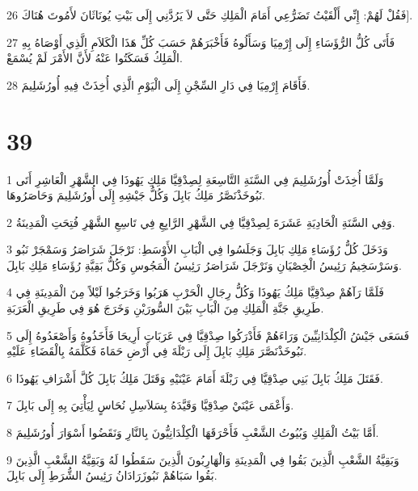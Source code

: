 \par 26 فَقُلْ لَهُمْ: إِنِّي أَلْقَيْتُ تَضَرُّعِي أَمَامَ الْمَلِكِ حَتَّى لاَ يَرُدَّنِي إِلَى بَيْتِ يُونَاثَانَ لأَمُوتَ هُنَاكَ].
\par 27 فَأَتَى كُلُّ الرُّؤَسَاءِ إِلَى إِرْمِيَا وَسَأَلُوهُ فَأَخْبَرَهُمْ حَسَبَ كُلِّ هَذَا الْكَلاَمِ الَّذِي أَوْصَاهُ بِهِ الْمَلِكُ فَسَكَتُوا عَنْهُ لأَنَّ الأَمْرَ لَمْ يُسْمَعْ.
\par 28 فَأَقَامَ إِرْمِيَا فِي دَارِ السِّجْنِ إِلَى الْيَوْمِ الَّذِي أُخِذَتْ فِيهِ أُورُشَلِيمَ.

\chapter{39}

\par 1 وَلَمَّا أُخِذَتْ أُورُشَلِيمَ فِي السَّنَةِ التَّاسِعَةِ لِصِدْقِيَّا مَلِكِ يَهُوذَا فِي الشَّهْرِ الْعَاشِرِ أَتَى نَبُوخَذْنَصَّرُ مَلِكُ بَابِلَ وَكُلُّ جَيْشِهِ إِلَى أُورُشَلِيمَ وَحَاصَرُوهَا.
\par 2 وَفِي السَّنَةِ الْحَادِيَةِ عَشَرَةَ لِصِدْقِيَّا فِي الشَّهْرِ الرَّابِعِ فِي تَاسِعِ الشَّهْرِ فُتِحَتِ الْمَدِينَةُ.
\par 3 وَدَخَلَ كُلُّ رُؤَسَاءِ مَلِكِ بَابِلَ وَجَلَسُوا فِي الْبَابِ الأَوْسَطِ: نَرْجَلَ شَرَاصَرُ وَسَمْجَرْ نَبُو وَسَرْسَخِيمُ رَئِيسُ الْخِصْيَانِ وَنَرْجَلَ شَرَاصَرُ رَئِيسُ الْمَجُوسِ وَكُلُّ بَقِيَّةِ رُؤَسَاءِ مَلِكِ بَابِلَ.
\par 4 فَلَمَّا رَآهُمْ صِدْقِيَّا مَلِكُ يَهُوذَا وَكُلُّ رِجَالِ الْحَرْبِ هَرَبُوا وَخَرَجُوا لَيْلاً مِنَ الْمَدِينَةِ فِي طَرِيقِ جَنَّةِ الْمَلِكِ مِنَ الْبَابِ بَيْنَ السُّورَيْنِ وَخَرَجَ هُوَ فِي طَرِيقِ الْعَرَبَةِ.
\par 5 فَسَعَى جَيْشُ الْكِلْدَانِيِّينَ وَرَاءَهُمْ فَأَدْرَكُوا صِدْقِيَّا فِي عَرَبَاتِ أَرِيحَا فَأَخَذُوهُ وَأَصْعَدُوهُ إِلَى نَبُوخَذْنَصَّرَ مَلِكِ بَابِلَ إِلَى رَبْلَةَ فِي أَرْضِ حَمَاةَ فَكَلَّمَهُ بِالْقَضَاءِ عَلَيْهِ.
\par 6 فَقَتَلَ مَلِكُ بَابِلَ بَنِي صِدْقِيَّا فِي رَبْلَةَ أَمَامَ عَيْنَيْهِ وَقَتَلَ مَلِكُ بَابِلَ كُلَّ أَشْرَافِ يَهُوذَا.
\par 7 وَأَعْمَى عَيْنَيْ صِدْقِيَّا وَقَيَّدَهُ بِسَلاَسِلِ نُحَاسٍ لِيَأْتِيَ بِهِ إِلَى بَابِلَ.
\par 8 أَمَّا بَيْتُ الْمَلِكِ وَبُيُوتُ الشَّعْبِ فَأَحْرَقَهَا الْكِلْدَانِيُّونَ بِالنَّارِ وَنَقَضُوا أَسْوَارَ أُورُشَلِيمَ.
\par 9 وَبَقِيَّةُ الشَّعْبِ الَّذِينَ بَقُوا فِي الْمَدِينَةِ وَالْهَارِبُونَ الَّذِينَ سَقَطُوا لَهُ وَبَقِيَّةُ الشَّعْبِ الَّذِينَ بَقُوا سَبَاهُمْ نَبُوزَرَادَانُ رَئِيسُ الشُّرَطِ إِلَى بَابِلَ.

